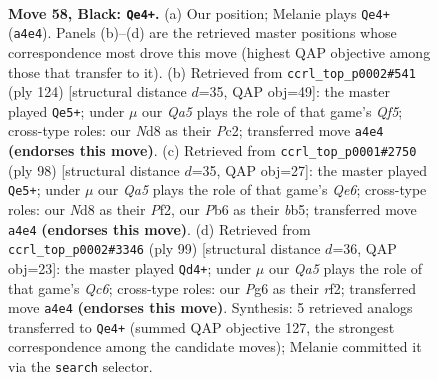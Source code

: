 \documentclass[11pt]{article}
\begin{document}
\clearpage

\begin{figure}[p]\centering
\begin{subfigure}{0.46\textwidth}\centering
\resizebox{\linewidth}{!}{%
\newchessgame
\chessboard[
  setfen={2kn2Q1/p1p3p1/1p4p1/2p5/q7/2P5/1P6/1K6 b - - 17 58},
  showmover=false,
  pgfstyle=straightmove, color=movearrow, markmove={a4-e4}
]}
\caption{}
\end{subfigure}\hfill
\begin{subfigure}{0.46\textwidth}\centering
\resizebox{\linewidth}{!}{%
\newchessgame
\chessboard[
  setfen={1k6/1p6/p6p/P4Q2/1P4P1/1K6/2P5/3q4 w - - 19 63},
  showmover=false,
  pgfstyle=straightmove, color=movearrow, markmove={f5-e5}
]}
\caption{}
\end{subfigure}
\\[4pt]
\begin{subfigure}{0.46\textwidth}\centering
\resizebox{\linewidth}{!}{%
\newchessgame
\chessboard[
  setfen={8/6k1/p2PQ3/1b5p/7P/6P1/3q1P1K/8 w - - 13 50},
  showmover=false,
  pgfstyle=straightmove, color=movearrow, markmove={e6-e5}
]}
\caption{}
\end{subfigure}\hfill
\begin{subfigure}{0.46\textwidth}\centering
\resizebox{\linewidth}{!}{%
\newchessgame
\chessboard[
  setfen={4Qnk1/6p1/p3p3/1p5P/2p3K1/P1q5/5R2/8 b - - 1 50},
  showmover=false,
  pgfstyle=straightmove, color=movearrow, markmove={c3-d4}
]}
\caption{}
\end{subfigure}
\caption{\textbf{Move 58, Black: \texttt{Qe4+}.} (a) Our position; Melanie plays \texttt{Qe4+} (\texttt{a4e4}). Panels (b)--(d) are the retrieved master positions whose correspondence most drove this move (highest QAP objective among those that transfer to it). (b) Retrieved from \texttt{ccrl\_top\_p0002\#541} (ply 124) [structural distance $d$=35, QAP obj=49]: the master played \texttt{Qe5+}; under $\mu$ our \emph{Qa5} plays the role of that game's \emph{Qf5}; cross-type roles: our \emph{N}d8 as their \emph{P}c2; transferred move \texttt{a4e4} \textbf{(endorses this move)}. (c) Retrieved from \texttt{ccrl\_top\_p0001\#2750} (ply 98) [structural distance $d$=35, QAP obj=27]: the master played \texttt{Qe5+}; under $\mu$ our \emph{Qa5} plays the role of that game's \emph{Qe6}; cross-type roles: our \emph{N}d8 as their \emph{P}f2, our \emph{P}b6 as their \emph{b}b5; transferred move \texttt{a4e4} \textbf{(endorses this move)}. (d) Retrieved from \texttt{ccrl\_top\_p0002\#3346} (ply 99) [structural distance $d$=36, QAP obj=23]: the master played \texttt{Qd4+}; under $\mu$ our \emph{Qa5} plays the role of that game's \emph{Qc6}; cross-type roles: our \emph{P}g6 as their \emph{r}f2; transferred move \texttt{a4e4} \textbf{(endorses this move)}. Synthesis: 5 retrieved analogs transferred to \texttt{Qe4+} (summed QAP objective 127, the strongest correspondence among the candidate moves); Melanie committed it via the \texttt{search} selector.}
\label{fig:thought-m115}
\end{figure}
\end{document}
